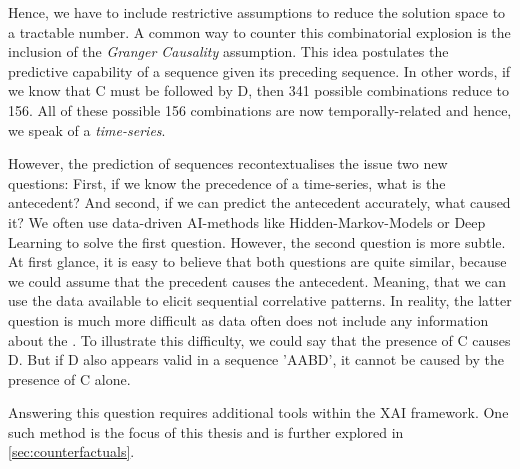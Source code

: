 \documentclass[./../../paper.tex]{subfiles}
\begin{document}
Hence, we have to include restrictive assumptions to reduce the solution space to a tractable number. A common way to counter this combinatorial explosion is the inclusion of the \emph{Granger Causality} assumption. This idea postulates the predictive capability of a sequence given its preceding sequence. 
In other words, if we know that C must be followed by D, then 341 possible combinations reduce to 156. All of these possible 156 combinations are now temporally-related and hence, we speak of a \emph{time-series}.


However, the prediction of sequences recontextualises the issue two new questions: 
First, if we know the precedence of a time-series, what is the antecedent? 
And second, if we can predict the antecedent accurately, what caused it? 
We often use data-driven AI-methods like Hidden-Markov-Models or Deep Learning to solve the first question. 
However, the second question is more subtle. At first glance, it is easy to believe that both questions are quite similar, because we could assume that the precedent causes the antecedent. Meaning, that we can use the data available to elicit sequential correlative patterns. 
In reality, the latter question is much more difficult as data often does not include any information about the . 
To illustrate this difficulty, we could say that the presence of C causes D. 
But if D also appears valid in a sequence 'AABD', it cannot be caused by the presence of C alone. 

Answering this question requires additional tools within the \gls{XAI} framework. 
One such method is the focus of this thesis and is further explored in \autoref{sec:counterfactuals}.
\end{document}
